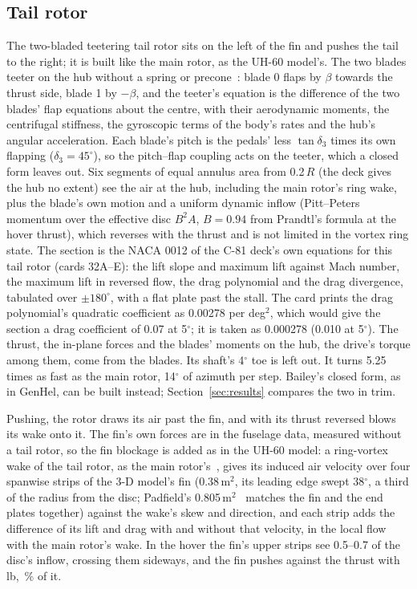 \documentclass[10pt,a4paper,twocolumn]{article}
\begin{document}
\subsection{Tail rotor}
The two-bladed teetering tail rotor sits on the left of the fin and pushes the tail to the right; it is built like the main rotor, as the
UH-60 model's. The two blades teeter on the hub without a spring or precone~\cite{tr}: blade 0 flaps by $\beta$ towards the thrust side, blade 1
by $-\beta$, and the teeter's equation is the difference of the two blades' flap equations about the centre, with their aerodynamic moments,
the centrifugal stiffness, the gyroscopic terms of the body's rates and the hub's angular acceleration. Each blade's pitch is the pedals' less
$\tan\delta_3$ times its own flapping ($\delta_3=45^\circ$), so the pitch--flap coupling acts on the teeter, which a closed form leaves out. Six
segments of equal annulus area from 0.2\,$R$ (the deck gives the hub no extent) see the air at the hub, including the main rotor's ring
wake, plus the blade's own motion and a uniform dynamic inflow (Pitt--Peters momentum over the effective disc $B^2A$, $B=0.94$ from
Prandtl's formula at the hover thrust), which reverses with the thrust and is not limited in the vortex ring state. The section is the NACA
0012 of the C-81 deck's own equations for this tail rotor (cards 32A--E): the lift slope and maximum lift against Mach number, the maximum
lift in reversed flow, the drag polynomial and the drag divergence, tabulated over $\pm180^\circ$, with a flat plate past the stall. The
card prints the drag polynomial's quadratic coefficient as 0.00278 per deg$^2$, which would give the section a drag coefficient of 0.07 at
5$^\circ$; it is taken as 0.000278 (0.010 at 5$^\circ$). The thrust, the in-plane forces and the blades' moments on the hub, the drive's
torque among them, come from the blades. Its shaft's 4$^\circ$ toe is left out. It turns 5.25 times as fast as the main rotor,
14$^\circ$ of azimuth per step. Bailey's closed form, as in GenHel, can be built instead; Section~\ref{sec:results} compares the two in trim.

Pushing, the rotor draws its air past the fin, and with its thrust reversed blows its wake onto it. The fin's own forces are in the fuselage
data, measured without a tail rotor, so the fin blockage is added as in the UH-60 model: a ring-vortex wake of the tail rotor, as the main
rotor's~\cite{hk}, gives its induced air velocity over four spanwise strips of the 3-D model's fin (0.38\,m$^2$, its leading edge swept
38$^\circ$, a third of the radius from the disc; Padfield's 0.805\,m$^2$~\cite{pad} matches the fin and the end plates together) against the
wake's skew and direction, and each strip adds the difference of its lift and drag with and without that velocity, in the local flow with the
main rotor's wake. In the hover the fin's upper strips see 0.5--0.7 of the disc's inflow, crossing them sideways, and the fin pushes against
the thrust with \NFinHoverLb\,lb, \NFinHoverPct\,\% of it.
\end{document}
